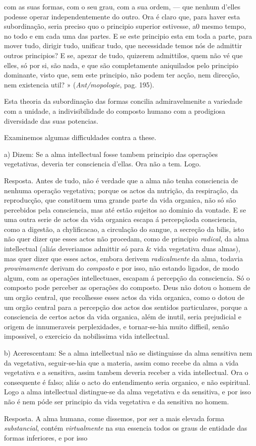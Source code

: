 com as suas formas, com o seu grau, com a sua ordem, --- que nenhum d'elles podesse operar independentemente do outro. Ora é claro que, para haver esta subordinação, seria preciso quo o principio superior estivesse, a0 mesmo tempo, no todo e em cada uma das partes. E se este principio esta em toda a parte, para mover tudo, dirigir tudo, unificar tudo, que necessidade temos nós de admittir outros principios? E se, apezar de tudo, quizerem admittilos, quem não vé que elles, só por si, são nada, e que são completamente aniquilados pelo principio dominante, visto que, sem este principio, não podem ter acção, nem direcção, nem existencia util? » (\emph{Ant/mopologie}, pag. 195).\par Esta theoria da subordinação das formas concilia admiravelmenite a variedade com a unidade, a indivisibilidade do composto humano com a prodigiosa diversidade das suas potencias.\par Examinemos algumas difficuldades contra a these.\par a) Dizem: Se a alma intellectual fosse tambem principio das operações vegetativas, deveria ter consciencia d'ellas. Ora não a tem. Logo.\par Resposta. Antes de tudo, não é verdade que a alma não tenha consciencia de nenhuma operação vegetativa; porque os actos da nutrição, da respiração, da reproducção, que constituem uma grande parte da vida organica, não só são percebidos pela consciencia, mas até estão sujeitos ao dominio da vontade. E se uma outra serie de actos da vida organica escapa á percepçãoda consciencia, como a digestão, a chylificacao, a circulação do sangue, a secreção da bilis, isto não quer dizer que esses actos não procedam, como de principio \emph{radical}, da alma intellectual (aliás deveriamos admittir só para \& vida vegetativa duas almas), mas quer dizer que esses actos, embora derivem \emph{radicalmente} da alma, todavia \emph{prowimamente} derivam do \emph{composto} e por isso, não estando ligados, de modo algum, com as operações intellectuaes, escapam á percepção da consciencia. Só o composto pode perceber as operações do composto. Deus não dotou o homem de um orgão central, que recolhesse esses actos da vida organica, como o dotou de um orgão central para a percepção dos actos dos sentidos particulares, porque a consciencia de certos actos da vida organica, além de inutil, seria prejudicial e origem de innumeraveis perplexidades, e tornar-se-hia muito diffieil, senão impossivel, o exercicio da nobilissima vida intellectual.\par b) Acerescentam: Se a alma intellectual não se distinguisse da alma sensitiva nem da vegetativa, seguir-se-hia que a materia, assim como recebe da alma a vida vegetativa e a sensitiva, assim tambem deveria receber a vida intellectual. Ora o consequente é falso; aliás o acto do entendimento seria organico, e não espiritual. Logo a alma intellectual distingue-se da alma vegetativa e da sensitiva, e por isso não é nem póde ser principio da vida vegetativa e da sensitiva no homem.\par Resposta. A alma humana, come dissemos, por ser a mais elevada forma \emph{substancial}, contém \emph{virtualmente} na sua essencia todos os graus de entidade das formas inferiores, e por isso 